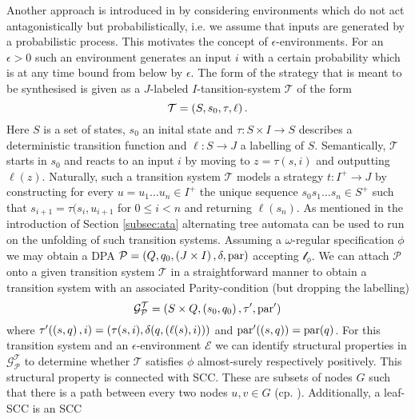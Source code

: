 Another approach is introduced in \cite{SynProbEnv} by considering environments
which do not act antagonistically but probabilistically, i.e. we assume that 
inputs are generated by a probabilistic process. This motivates the concept of 
$\epsilon$-environments. For an $\epsilon > 0$ such an environment generates an
input $i$ with a certain probability which is at any time bound from below by 
$\epsilon$. The form of the strategy that is meant to be synthesised is given
as a $J$-labeled $I$-tansition-system $\mathcal{T}$ of the form
\begin{equation*}
  \mathcal{T} = \left(S, s_{0}, \tau, \ell\right).
\end{equation*}
Here $S$ is a set of states, $s_{0}$ an inital state and 
$\tau:S\times I\rightarrow S$ describes a deterministic transition function and
$\ell:S\rightarrow J$ a labelling of $S$. Semantically, $\mathcal{T}$ starts in 
$s_{0}$ and reacts to an input $i$ by moving to $z = \tau(s,i)$ and outputting 
$\ell(z)$. Naturally, such a transition system $\mathcal{T}$ models a strategy 
$t:I^{+}\rightarrow J$ by constructing for every 
$u = u_{1}\dots u_{n}\in I^{+}$ the unique sequence 
$s_{0}s_{1}\dots s_{n}\in S^{+}$ such that $s_{i+1} = \tau(s_{i}, u_{i+1}$ for 
$0\leq i<n$ and returning $\ell(s_{n})$. As mentioned in the introduction of 
Section \ref{subsec:ata} alternating tree automata can be used to run on the 
unfolding of such transition systems. Assuming a $\omega$-regular specification 
$\phi$ we may obtain a \ac{DPA} 
$\mathcal{P} = \left(Q, q_{0}, \left(J\times I\right), \delta, \operatorname{par}\right)$ accepting 
$\mathcal{l}_{\phi}$. We can attach $\mathcal{P}$ onto a given transition 
system $\mathcal{T}$ in a straightforward manner to obtain a transition system 
with an associated Parity-condition (but dropping the labelling)
\begin{equation*}
  \mathcal{G}_{\mathcal{P}}^{\mathcal{T}} = \left(S\times Q, 
    \left(s_{0}, q_{0}\right), \tau', \operatorname{par}'\right)
\end{equation*}
where $\tau'(\left(s, q\right), i) = \left(\tau(s, i), 
\delta(q, \left(\ell(s), i\right))\right)$ and $\operatorname{par}'(\left(s, q\right)) = \operatorname{par}(q)$. For
this transition system and an $\epsilon$-environment $\mathcal{E}$ we can 
identify structural properties in $\mathcal{G}_{\mathcal{P}}^{\mathcal{T}}$ to
determine whether $\mathcal{T}$ satisfies $\phi$ almost-surely respectively 
positively. This structural property is connected with \ac{SCC}. These are 
subsets of nodes $G$ such that there is a path between every two nodes 
$u,v\in G$ (cp. \cite{Tarjan}). Additionally, a leaf-\ac{SCC} is an \ac{SCC} 
